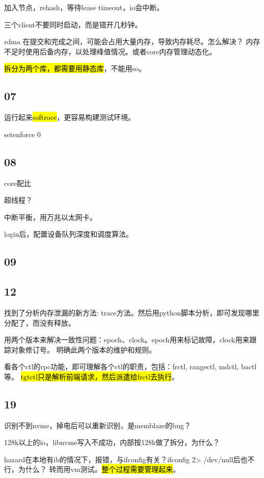 加入节点，rehash，等待lease timeout，io会中断。

三个client不要同时启动，而是错开几秒钟。

rdma 在提交和完成之间，可能会占用大量内存，导致内存耗尽。怎么解决？
内存不足时使用后备内存，以处理峰值情况。或者core内存管理动态化。

\hl{拆分为两个库，都需要用静态库}，不能用so。

\subsection{07}

运行起来\hl{softroce}，更容易构建测试环境。

setenforce 0

\subsection{08}

core配比

超线程？

中断平衡，用万兆以太网卡。

login后，配置设备队列深度和调度算法。

\subsection{09}

\subsection{12}

找到了分析内存泄漏的新方法: trace方法。然后用python脚本分析，即可发现哪里分配了，而没有释放。

用两个版本来解决一致性问题：epoch、clock。epoch用来标记故障，clock用来跟踪对象修订号。
明确此两个版本的维护和规则。

看各个ctl的rpc功能，即可理解各个ctl的职责，包括：frctl, rangectl, mdctl, bactl等。
\hl{tgtctl只是解析前端请求，然后派遣给frctl去执行}。

\subsection{19}

识别不到nvme，掉电后可以重新识别，是memblaze的bug？

128k以上的io，libnvme写入不成功，内部按128k做了拆分，为什么？

hazard在本地有ib的情况下，报错，与ifconfig有关？ifconfig 2> /dev/null后也不行，为什么？
转而用vm测试。\hl{整个过程需要管理起来}。

